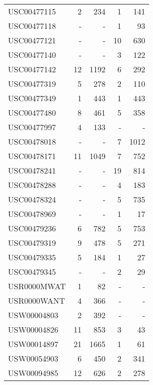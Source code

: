 \begin{table}[h!]
\begin{tabular}{l r r r r}
				USC00477115	 & 	2	 & 	234	 & 	1	 & 	141 \\
				USC00477118	 & 	-	 & 	-	 & 	1	 & 	93 \\
				USC00477121	 & 	-	 & 	-	 & 	10	 & 	630 \\
				USC00477140	 & 	-	 & 	-	 & 	3	 & 	122 \\
				USC00477142	 & 	12	 & 	1192	 & 	6	 & 	292 \\
				USC00477319	 & 	5	 & 	278	 & 	2	 & 	110 \\
				USC00477349	 & 	1	 & 	443	 & 	1	 & 	443 \\
				USC00477480	 & 	8	 & 	461	 & 	5	 & 	358 \\
				USC00477997	 & 	4	 & 	133	 & 	-	 & 	- \\
				USC00478018	 & 	-	 & 	-	 & 	7	 & 	1012 \\
				USC00478171	 & 	11	 & 	1049	 & 	7	 & 	752 \\
				USC00478241	 & 	-	 & 	-	 & 	19	 & 	814 \\
				USC00478288	 & 	-	 & 	-	 & 	4	 & 	183 \\
				USC00478324	 & 	-	 & 	-	 & 	5	 & 	735 \\
				USC00478969	 & 	-	 & 	-	 & 	1	 & 	17 \\
				USC00479236	 & 	6	 & 	782	 & 	5	 & 	753 \\
				USC00479319	 & 	9	 & 	478	 & 	5	 & 	271 \\
				USC00479335	 & 	5	 & 	184	 & 	1	 & 	27 \\
				USC00479345	 & 	-	 & 	-	 & 	2	 & 	29 \\
				USR0000MWAT	 & 	1	 & 	82	 & 	-	 & 	- \\
				USR0000WANT	 & 	4	 & 	366	 & 	-	 & 	- \\
				USW00004803	 & 	2	 & 	392	 & 	-	 & 	- \\
				USW00004826	 & 	11	 & 	853	 & 	3	 & 	43 \\
				USW00014897	 & 	21	 & 	1665	 & 	1	 & 	61 \\
				USW00054903	 & 	6	 & 	450	 & 	2	 & 	341 \\
				USW00094985	 & 	12	 & 	626	 & 	2	 & 	278 \\
			
			\hline		
		\end{tabular}
		
		\label{tab:climate_stations}
	\end{table}	
	



